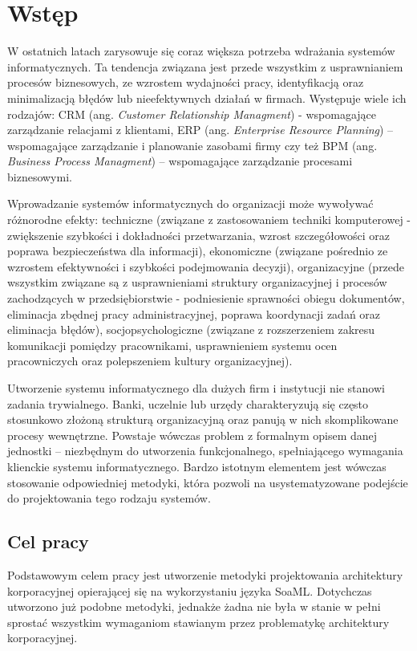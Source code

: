 \chapter{Wstęp}
W ostatnich latach zarysowuje się coraz większa potrzeba wdrażania systemów informatycznych. Ta tendencja związana  jest przede wszystkim z usprawnianiem procesów biznesowych, ze wzrostem wydajności pracy, identyfikacją oraz minimalizacją błędów lub nieefektywnych działań w firmach. Występuje wiele ich rodzajów: CRM (ang. \emph{Customer Relationship Managment}) - wspomagające zarządzanie relacjami z klientami, ERP (ang. \emph{Enterprise Resource Planning}) – wspomagające zarządzanie i planowanie zasobami firmy czy też BPM (ang. \emph{Business Process Managment}) – wspomagające zarządzanie procesami biznesowymi. 

Wprowadzanie systemów informatycznych do organizacji może wywoływać różnorodne efekty: techniczne (związane z zastosowaniem techniki komputerowej - zwiększenie szybkości i dokładności przetwarzania, wzrost szczegółowości oraz poprawa bezpieczeństwa dla informacji), ekonomiczne (związane pośrednio ze wzrostem efektywności i szybkości podejmowania decyzji), organizacyjne (przede wszystkim związane są z usprawnieniami struktury organizacyjnej i procesów zachodzących w przedsiębiorstwie - podniesienie sprawności obiegu dokumentów, eliminacja zbędnej pracy administracyjnej, poprawa koordynacji zadań oraz eliminacja błędów), socjopsychologiczne (związane z rozszerzeniem zakresu komunikacji pomiędzy pracownikami, usprawnieniem systemu ocen pracowniczych oraz polepszeniem kultury organizacyjnej). \cite{EfektyZasSys}

Utworzenie systemu informatycznego dla dużych firm i instytucji nie stanowi zadania trywialnego. Banki, uczelnie lub urzędy charakteryzują się często stosunkowo złożoną strukturą organizacyjną oraz panują w nich skomplikowane procesy wewnętrzne. Powstaje wówczas problem z formalnym opisem danej jednostki – niezbędnym do utworzenia funkcjonalnego, spełniającego wymagania klienckie systemu informatycznego. Bardzo istotnym elementem jest wówczas stosowanie odpowiedniej metodyki, która pozwoli na usystematyzowane podejście do projektowania tego rodzaju systemów. 

\section{Cel pracy}
Podstawowym celem pracy jest utworzenie metodyki projektowania architektury korporacyjnej opierającej się na wykorzystaniu języka SoaML. Dotychczas utworzono już podobne metodyki, jednakże żadna nie była w stanie w pełni sprostać wszystkim wymaganiom stawianym przez problematykę architektury korporacyjnej.


